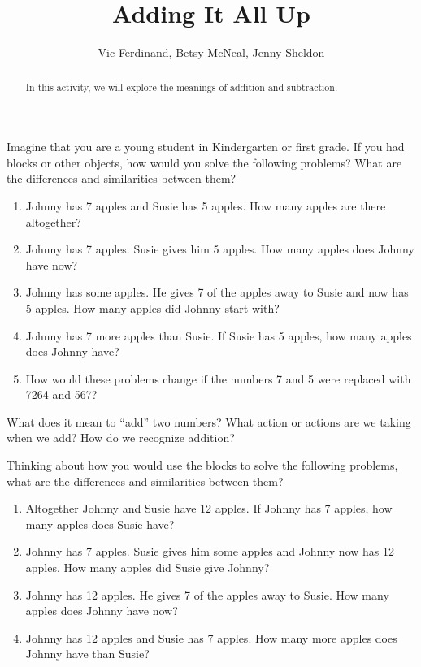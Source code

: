 \documentclass[nooutcomes,noauthor,handout]{ximera}
\title{Adding It All Up}
\author{Vic Ferdinand, Betsy McNeal, Jenny Sheldon}
\begin{document}
\begin{abstract} In this activity, we will explore the meanings of addition and subtraction. \end{abstract}
\maketitle



\begin{problem}
Imagine that you are a young student in Kindergarten or first grade.  If you had blocks or other objects, how would you solve the following problems?  What are the differences and similarities between them?
\begin{enumerate}
\item Johnny has 7 apples and Susie has 5 apples.  How many apples are there altogether?
\item Johnny has 7 apples.  Susie gives him 5 apples.  How many apples does Johnny have now?
\item Johnny has some apples.  He gives 7 of the apples away to Susie and now has 5 apples.  How many apples did Johnny start with?
\item Johnny has 7 more apples than Susie.  If Susie has 5 apples, how many apples does Johnny have?
\item How would these problems change if the numbers 7 and 5 were replaced with 7264 and 567?
\end{enumerate}
\end{problem}

\begin{problem}
What does it mean to ``add'' two numbers? What action or actions are we taking when we add? How do we recognize addition?
\end{problem}

\begin{problem}
 Thinking about how you would use the blocks to solve the following problems, what are the differences and similarities between them?
\begin{enumerate}
\item Altogether Johnny and Susie have 12 apples.  If Johnny has 7 apples, how many apples does Susie have?
\item Johnny has 7 apples.  Susie gives him some apples and Johnny now has 12 apples.  How many apples did Susie give Johnny?
\item Johnny has 12 apples.  He gives 7 of the apples away to Susie.  How many apples does Johnny have now?
\item Johnny has 12 apples and Susie has 7 apples.  How many more apples does Johnny have than Susie?
\end{enumerate}
\end{problem}
\end{document}

